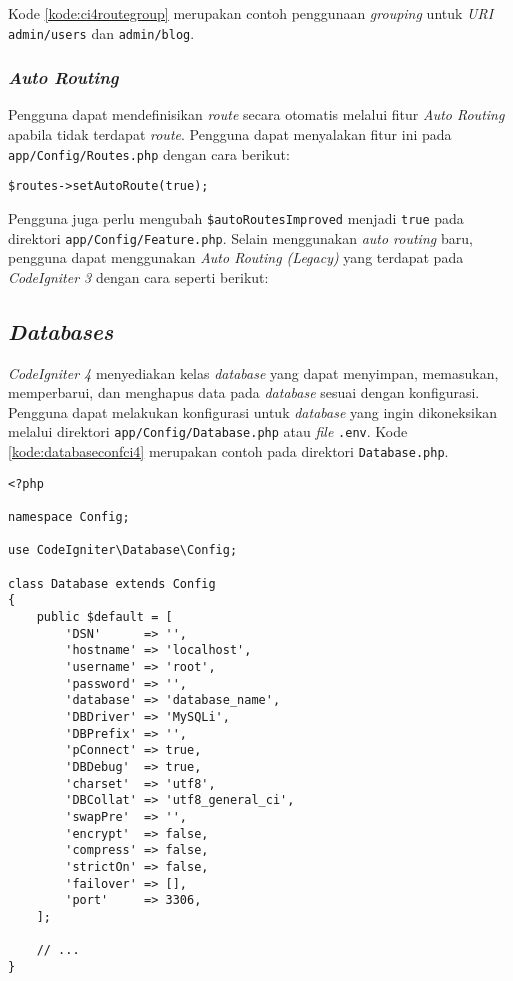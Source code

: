 Kode \ref{kode:ci4routegroup} merupakan contoh penggunaan \textit{grouping} untuk \textit{URI} \texttt{admin/users} dan \texttt{admin/blog}.

\subsubsection{\textit{Auto Routing}\label{subsubsec:autorouting}} 
Pengguna dapat mendefinisikan \textit{route} secara otomatis melalui fitur \textit{Auto Routing} apabila tidak terdapat \textit{route}. Pengguna dapat menyalakan  fitur ini pada \texttt{app/Config/Routes.php} dengan cara berikut:
\begin{center}
\verb|$routes->setAutoRoute(true);|
\end{center}
Pengguna juga perlu mengubah \verb|$autoRoutesImproved| menjadi \verb|true| pada direktori \verb|app/Config/Feature.php|. Selain menggunakan \textit{auto routing} baru, pengguna dapat menggunakan \textit{Auto Routing (Legacy)} yang terdapat pada \textit{CodeIgniter 3} dengan cara seperti berikut:


\subsection{\textit{Databases}}
\textit{CodeIgniter 4} menyediakan kelas \textit{database} yang dapat menyimpan, memasukan, memperbarui, dan menghapus data pada \textit{database} sesuai dengan konfigurasi. Pengguna dapat melakukan konfigurasi untuk \textit{database} yang ingin dikoneksikan melalui direktori \verb|app/Config/Database.php| atau \textit{file} \verb|.env|. Kode \ref{kode:databaseconfci4} merupakan contoh pada direktori \verb|Database.php|.

\begin{lstlisting}[caption=Contoh konfigurasi \textit{database} pada \textit{CodeIgniter 4}. ,label=kode:databaseconfci4]
<?php

namespace Config;

use CodeIgniter\Database\Config;

class Database extends Config
{
    public $default = [
        'DSN'      => '',
        'hostname' => 'localhost',
        'username' => 'root',
        'password' => '',
        'database' => 'database_name',
        'DBDriver' => 'MySQLi',
        'DBPrefix' => '',
        'pConnect' => true,
        'DBDebug'  => true,
        'charset'  => 'utf8',
        'DBCollat' => 'utf8_general_ci',
        'swapPre'  => '',
        'encrypt'  => false,
        'compress' => false,
        'strictOn' => false,
        'failover' => [],
        'port'     => 3306,
    ];

    // ...
}
\end{lstlisting}

